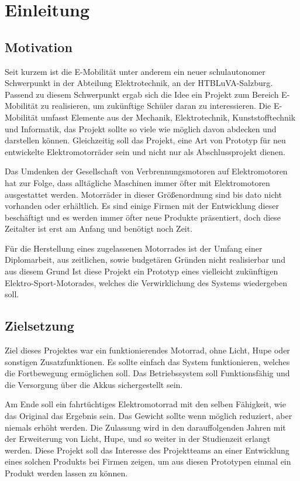 \chapter{Einleitung}

\section{Motivation}
Seit kurzem ist die E-Mobilität unter anderem ein neuer schulautonomer Schwerpunkt in der Abteilung Elektrotechnik, an der HTBLuVA-Salzburg. Passend zu diesem Schwerpunkt ergab sich die Idee ein Projekt zum Bereich E-Mobilität zu realisieren, um zukünftige Schüler daran zu interessieren.
Die E-Mobilität umfasst Elemente aus der Mechanik, Elektrotechnik, Kunststofftechnik und Informatik, das Projekt sollte so viele wie möglich  davon abdecken und darstellen können. Gleichzeitig soll das Projekt, eine Art von Prototyp für neu entwickelte Elektromotorräder sein und nicht nur als Abschlussprojekt dienen.

Das Umdenken der Gesellschaft von Verbrennungsmotoren auf Elektromotoren hat zur Folge, dass alltägliche Maschinen immer öfter mit Elektromotoren ausgestattet werden. Motorräder in dieser Größenordnung sind bis dato nicht vorhanden oder erhältlich. Es sind einige Firmen mit der Entwicklung dieser beschäftigt und es werden immer öfter neue Produkte präsentiert, doch diese Zeitalter ist erst am Anfang und benötigt noch Zeit.

Für die Herstellung eines zugelassenen Motorrades ist der Umfang einer Diplomarbeit, aus zeitlichen, sowie budgetären Gründen nicht realisierbar und aus diesem Grund Ist diese Projekt ein Prototyp eines vielleicht zukünftigen Elektro-Sport-Motorades, welches die Verwirklichung des Systems wiedergeben soll.
\newpage

\section{Zielsetzung}
Ziel dieses Projektes war ein funktionierendes Motorrad, ohne Licht, Hupe oder sonstigen Zusatzfunktionen. Es sollte einfach das System funktionieren, welches die Fortbewegung ermöglichen soll. Das Betriebssystem soll Funktionsfähig und die Versorgung über die Akkus sichergestellt sein. 

Am Ende soll ein fahrtüchtiges Elektromotorrad mit den selben Fähigkeit, wie das Original das Ergebnis sein. Das Gewicht sollte wenn möglich reduziert, aber niemals erhöht werden. Die Zulassung wird in den darauffolgenden Jahren mit der Erweiterung von Licht, Hupe, und so weiter in der Studienzeit erlangt werden. Diese Projekt soll das Interesse des Projektteams an einer Entwicklung eines solchen Produkts bei Firmen zeigen, um aus diesen Prototypen einmal ein Produkt werden lassen zu können.


